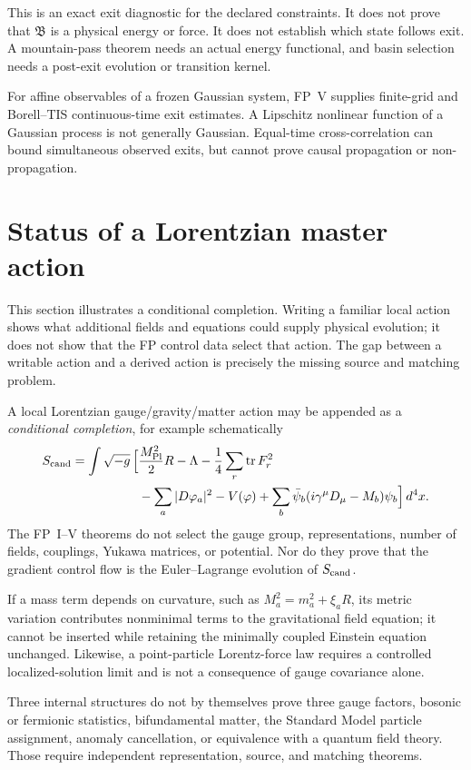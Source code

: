 \documentclass[11pt]{article}
\begin{document}
This is an exact exit diagnostic for the declared constraints. It does not
prove that $\mathfrak B$ is a physical energy or force. It does not establish
which state follows exit. A mountain-pass theorem needs an actual energy
functional, and basin selection needs a post-exit evolution or transition
kernel.

For affine observables of a frozen Gaussian system, FP~V supplies finite-grid
and Borell--TIS continuous-time exit estimates. A Lipschitz nonlinear function
of a Gaussian process is not generally Gaussian. Equal-time cross-correlation
can bound simultaneous observed exits, but cannot prove causal propagation or
non-propagation.

\section{Status of a Lorentzian master action}

This section illustrates a conditional completion.  Writing a familiar local
action shows what additional fields and equations could supply physical
evolution; it does not show that the FP control data select that action.  The
gap between a writable action and a derived action is precisely the missing
source and matching problem.

A local Lorentzian gauge/gravity/matter action may be appended as a
\emph{conditional completion}, for example schematically
\[
\begin{aligned}
S_{\rm cand}=\int\sqrt{-g}\,\Bigl[
&\frac{M_{\rm Pl}^2}{2}R-\Lambda
-\frac14\sum_r\operatorname{tr}F_r^2\\
&-\sum_a|D\varphi_a|^2-V(\varphi)
+\sum_b\bar\psi_b(i\gamma^\mu D_\mu-M_b)\psi_b
\Bigr]\,d^4x.
\end{aligned}
\]
The FP~I--V theorems do not select the gauge group, representations, number of
fields, couplings, Yukawa matrices, or potential. Nor do they prove that the
gradient control flow is the Euler--Lagrange evolution of $S_{\rm cand}$.

If a mass term depends on curvature, such as
$M_a^2=m_a^2+\xi_aR$, its metric variation contributes nonminimal terms to
the gravitational field equation; it cannot be inserted while retaining the
minimally coupled Einstein equation unchanged. Likewise, a point-particle
Lorentz-force law requires a controlled localized-solution limit and is not a
consequence of gauge covariance alone.

Three internal structures do not by themselves prove three gauge factors,
bosonic or fermionic statistics, bifundamental matter, the Standard Model
particle assignment, anomaly cancellation, or equivalence with a quantum
field theory. Those require independent representation, source, and matching
theorems.
\end{document}
